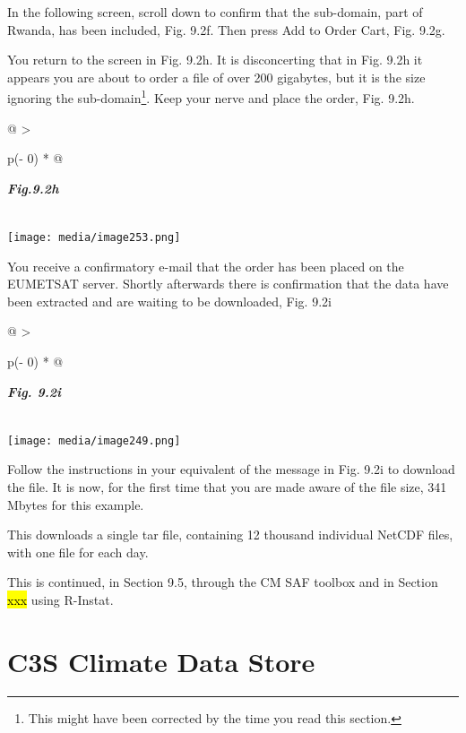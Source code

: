 \documentclass[
  letterpaper,
  DIV=11,
  numbers=noendperiod]{scrreprt}
\begin{document}
In the following screen, scroll down to confirm that the sub-domain,
part of Rwanda, has been included, Fig. 9.2f. Then press Add to Order
Cart, Fig. 9.2g.

You return to the screen in Fig. 9.2h. It is disconcerting that in Fig.
9.2h it appears you are about to order a file of over 200 gigabytes, but
it is the size ignoring the sub-domain\footnote{This might have been
  corrected by the time you read this section.}. Keep your nerve and
place the order, Fig. 9.2h.

\begin{longtable}[]{@{}
  >{\raggedright\arraybackslash}p{(\columnwidth - 0\tabcolsep) * }@{}}
\toprule\noalign{}
\begin{minipage}[b]{\linewidth}\raggedright
\textbf{\emph{Fig.9.2h}}
\end{minipage} \\
\midrule\noalign{}
\endhead
\bottomrule\noalign{}
\endlastfoot
\texttt{[image: media/image253.png]} \\
\end{longtable}

You receive a confirmatory e-mail that the order has been placed on the
EUMETSAT server. Shortly afterwards there is confirmation that the data
have been extracted and are waiting to be downloaded, Fig. 9.2i

\begin{longtable}[]{@{}
  >{\raggedright\arraybackslash}p{(\columnwidth - 0\tabcolsep) * }@{}}
\toprule\noalign{}
\begin{minipage}[b]{\linewidth}\raggedright
\textbf{\emph{Fig. 9.2i}}
\end{minipage} \\
\midrule\noalign{}
\endhead
\bottomrule\noalign{}
\endlastfoot
\texttt{[image: media/image249.png]} \\
\end{longtable}

Follow the instructions in your equivalent of the message in Fig. 9.2i
to download the file. It is now, for the first time that you are made
aware of the file size, 341 Mbytes for this example.

This downloads a single tar file, containing 12 thousand individual
NetCDF files, with one file for each day.

This is continued, in Section 9.5, through the CM SAF toolbox and in
Section \hl{xxx} using R-Instat.

\section{C3S Climate Data Store}\label{c3s-climate-data-store}
\end{document}
